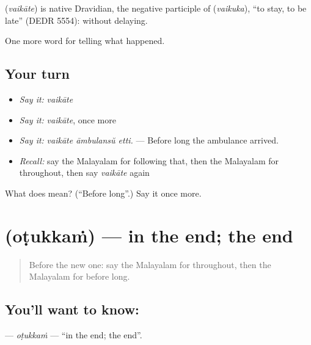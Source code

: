 \begin{cousinweb}
\textbf{} (\emph{vaikāte}) is native Dravidian, the negative participle of  (\emph{vaikuka}), \textquotedblleft{}to stay, to be late\textquotedblright{} (DEDR 5554): without delaying.
\end{cousinweb}

\begin{grammarlens}[title={What you've built}]
One more word for telling what happened.
\end{grammarlens}

\subsection*{Your turn}
\begin{itemize}
\raggedright
  \item \emph{Say it:} \emph{vaikāte}
  \item \emph{Say it:} \emph{vaikāte}, once more
  \item \emph{Say it:} \emph{vaikāte āmbulansŭ etti.} — Before long the ambulance arrived.
  \item \emph{Recall:} say the Malayalam for following that, then the Malayalam for throughout, then say \emph{vaikāte} again
\end{itemize}

\begin{tcolorbox}[breakable,colback=teal!4,colframe=teal!35!black,title={Before you move on}]
What does  mean? (\textquotedblleft{}Before long\textquotedblright{}.) Say it once more.
\end{tcolorbox}
\section[\texorpdfstring{\ml{ഒടുക്കം} (oṭukkaṁ)}{ഒടുക്കം (oṭukkaṁ)}]{ (oṭukkaṁ) — in the end; the end}

\label{lesson:ML-C359-otukkam}



\begin{quote}
Before the new one: say the Malayalam for throughout, then the Malayalam for before long.
\end{quote}

\subsection*{You'll want to know: }
\textbf{} — \emph{oṭukkaṁ} — \textquotedblleft{}in the end; the end\textquotedblright{}.

